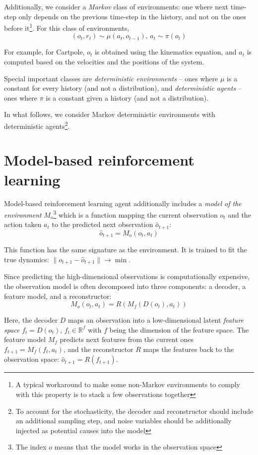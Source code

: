 \documentclass[a4paper,11pt,oneside]{report}
\begin{document}
Additionally, we consider a {\em Markov} class of environments: one where next time-step only depends on the previous time-step in the history, and not on the ones before it\footnote{A typical workaround to make some non-Markov environments to comply with this property is to stack a few observations together}. For this class of environments,
$$
(o_t, r_t)\sim \mu(a_t, o_{t-1}),\,a_t\sim\pi(o_t)
$$

For example, for Cartpole, $o_t$ is obtained using the kinematics equation, and $a_t$ is computed based on the velocities and the positions of the system.

Special important classes are {\em deterministic environments} -- ones where $\mu$ is a constant for every history (and not a distribution), and {\em deterministic agents} -- ones where $\pi$ is a constant given a history (and not a distribution).

In what follows, we consider Markov deterministic environments with deterministic agents\footnote{To account for the stochasticity, the decoder and reconstructor should include an additional sampling step, and noise variables should be additionally injected as potential causes into the model}.


\section{Model-based reinforcement learning}
\label{sec:mbrl}
Model-based reinforcement learning \cite{DeBruin2018,Corneil2018,Kaiser2019} agent additionally includes a {\em model of the environment} $M_o$\footnote{The index $o$ means that the model works in the observation space} which is a function mapping the current observation $o_t$ and the action taken $a_t$ to the predicted next observation $\hat{o}_{t+1}$:
$$
\hat{o}_{t+1}=M_o(o_t, a_t)
$$

This function has the same signature as the environment. It is trained to fit the true dynamics: $\|o_{t+1}-\hat{o}_{t+1}\|\to\min$.

Since predicting the high-dimensional observations is computationally expensive, the observation model is often decomposed into three components: a decoder, a feature model, and a reconstructor:
$$
M_o(o_t, a_t)=R(M_f(D(o_t), a_t))
$$

Here, the decoder $D$ maps an observation into a low-dimensional latent {\em feature space} $f_t=D(o_t)$, $f_t\in \mathbb R^f$ with $f$ being the dimension of the feature space. The feature model $M_f$ predicts next features from the current ones $f_{t+1}=M_f(f_t,a_t)$, and the reconstructor $R$ maps the features back to the observation space: $\hat{o}_{t+1}=R(f_{t+1})$.
\end{document}
